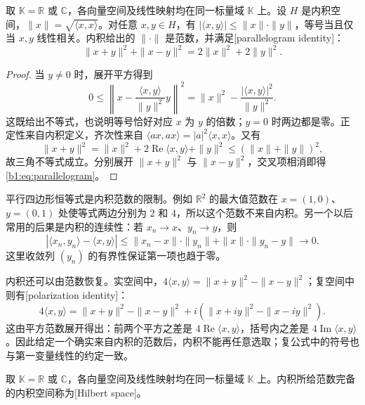\begin{proposition}\label{b1:prop:inner-product-norm}
取 \(\mathbb K=\mathbb R\) 或 \(\mathbb C\)，各向量空间及线性映射均在同一标量域 \(\mathbb K\) 上。设 \(H\) 是内积空间，\(\|x\|=\sqrt{\langle x,x\rangle}\)。对任意 \(x,y\in H\)，有 \(|\langle x,y\rangle|\leq\|x\|\cdot\|y\|\)，等号当且仅当 \(x,y\) 线性相关。内积给出的 \(\|\cdot\|\) 是范数，并满足[parallelogram identity]：
\begin{equation}\label{b1:eq:parallelogram}
\|x+y\|^2+\|x-y\|^2=2\|x\|^2+2\|y\|^2.
\end{equation}
\end{proposition}
\begin{proof}
当 \(y\ne0\) 时，展开平方得到
\[
0\leq\left\|x-\dfrac{\langle x,y\rangle}{\|y\|^2}y\right\|^2
=\|x\|^2-\dfrac{|\langle x,y\rangle|^2}{\|y\|^2}.
\]
这既给出不等式，也说明等号恰好对应 \(x\) 为 \(y\) 的倍数；\(y=0\) 时两边都是零。正定性来自内积定义，齐次性来自 \(\langle ax,ax\rangle=|a|^2\langle x,x\rangle\)。又有
\[
\|x+y\|^2
=\|x\|^2+2\operatorname{Re}\langle x,y\rangle+\|y\|^2
\leq\left(\|x\|+\|y\|\right)^2,
\]
故三角不等式成立。分别展开 \(\|x+y\|^2\) 与 \(\|x-y\|^2\)，交叉项相消即得\eqref{b1:eq:parallelogram}。
\end{proof}

平行四边形恒等式是内积范数的限制。例如 \(\mathbb R^2\) 的最大值范数在 \(x=(1,0)\)、\(y=(0,1)\) 处使等式两边分别为 \(2\) 和 \(4\)，所以这个范数不来自内积。另一个以后常用的后果是内积的连续性：若 \(x_n\to x\)、\(y_n\to y\)，则
\[
|\langle x_n,y_n\rangle-\langle x,y\rangle|
\leq\|x_n-x\|\cdot\|y_n\|+\|x\|\cdot\|y_n-y\|\longrightarrow0.
\]
这里收敛列 \((y_n)\) 的有界性保证第一项也趋于零。

\ProseParagraphBreak

内积还可以由范数恢复。实空间中，\(4\langle x,y\rangle=\|x+y\|^2-\|x-y\|^2\)；复空间中则有[polarization identity]：
\[
4\langle x,y\rangle
=\|x+y\|^2-\|x-y\|^2
+i\left(\|x+iy\|^2-\|x-iy\|^2\right).
\]
这由平方范数展开得出：前两个平方之差是 \(4\operatorname{Re}\langle x,y\rangle\)，括号内之差是 \(4\operatorname{Im}\langle x,y\rangle\)。因此给定一个确实来自内积的范数后，内积不能再任意选取；复公式中的符号也与第一变量线性的约定一致。

\begin{definition}\label{b1:def:hilbert-space}
取 \(\mathbb K=\mathbb R\) 或 \(\mathbb C\)，各向量空间及线性映射均在同一标量域 \(\mathbb K\) 上。内积所给范数完备的内积空间称为[Hilbert space]。
\end{definition}

